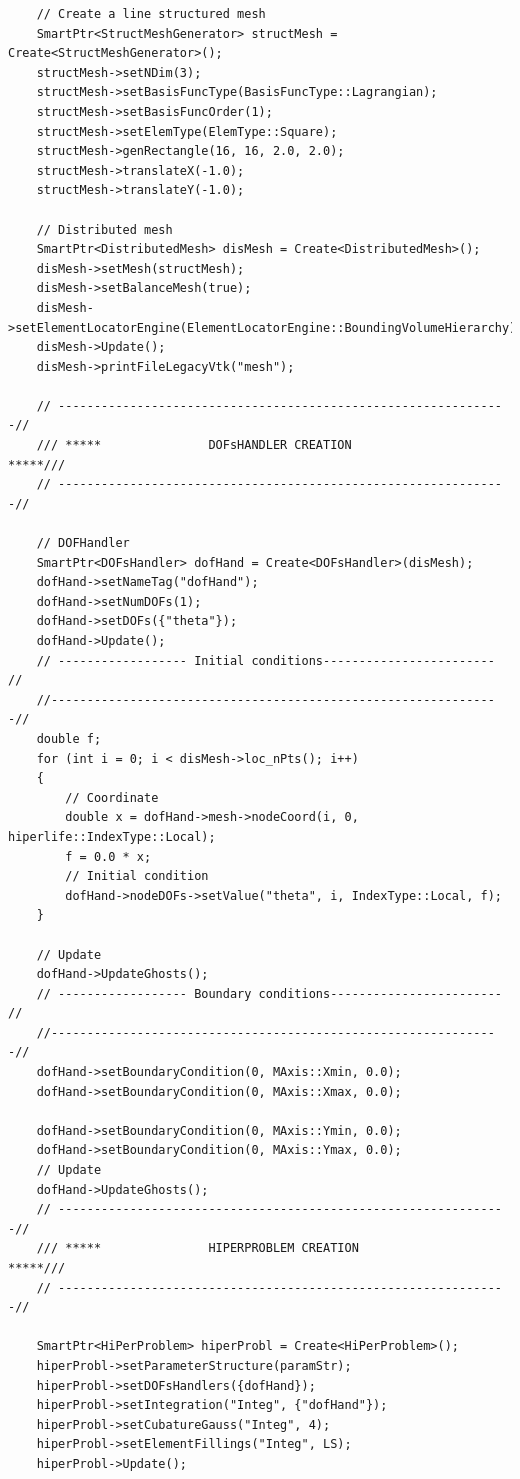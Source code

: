 \documentclass[]{article}
\begin{document}
\begin{lstlisting}
	// Create a line structured mesh       
	SmartPtr<StructMeshGenerator> structMesh = Create<StructMeshGenerator>();
	structMesh->setNDim(3);
	structMesh->setBasisFuncType(BasisFuncType::Lagrangian);
	structMesh->setBasisFuncOrder(1);
	structMesh->setElemType(ElemType::Square);
	structMesh->genRectangle(16, 16, 2.0, 2.0);
	structMesh->translateX(-1.0);
	structMesh->translateY(-1.0);
		
	// Distributed mesh
	SmartPtr<DistributedMesh> disMesh = Create<DistributedMesh>();
	disMesh->setMesh(structMesh);
	disMesh->setBalanceMesh(true);
	disMesh->setElementLocatorEngine(ElementLocatorEngine::BoundingVolumeHierarchy);
	disMesh->Update();
	disMesh->printFileLegacyVtk("mesh");
		
	// ---------------------------------------------------------------//
	/// *****               DOFsHANDLER CREATION                *****///
	// ---------------------------------------------------------------//
		
	// DOFHandler
	SmartPtr<DOFsHandler> dofHand = Create<DOFsHandler>(disMesh);
	dofHand->setNameTag("dofHand");
	dofHand->setNumDOFs(1);
	dofHand->setDOFs({"theta"});
	dofHand->Update();
	// ------------------ Initial conditions------------------------ //
	//---------------------------------------------------------------//
	double f;
	for (int i = 0; i < disMesh->loc_nPts(); i++)
	{
		// Coordinate
		double x = dofHand->mesh->nodeCoord(i, 0, hiperlife::IndexType::Local);
		f = 0.0 * x;
		// Initial condition
		dofHand->nodeDOFs->setValue("theta", i, IndexType::Local, f);
	}
		
	// Update 
	dofHand->UpdateGhosts();
	// ------------------ Boundary conditions------------------------ //
	//---------------------------------------------------------------//
	dofHand->setBoundaryCondition(0, MAxis::Xmin, 0.0);
	dofHand->setBoundaryCondition(0, MAxis::Xmax, 0.0);
		
	dofHand->setBoundaryCondition(0, MAxis::Ymin, 0.0);
	dofHand->setBoundaryCondition(0, MAxis::Ymax, 0.0);
	// Update 
	dofHand->UpdateGhosts();
	// ---------------------------------------------------------------//
	/// *****               HIPERPROBLEM CREATION               *****///
	// ---------------------------------------------------------------//
		
	SmartPtr<HiPerProblem> hiperProbl = Create<HiPerProblem>();
	hiperProbl->setParameterStructure(paramStr);
	hiperProbl->setDOFsHandlers({dofHand});
	hiperProbl->setIntegration("Integ", {"dofHand"});
	hiperProbl->setCubatureGauss("Integ", 4);
	hiperProbl->setElementFillings("Integ", LS);
	hiperProbl->Update();
		

\end{lstlisting}
\end{document}
